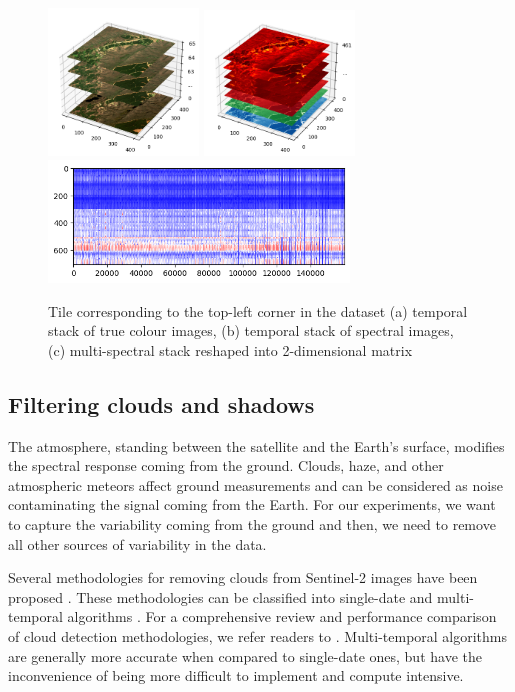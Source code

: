 \documentclass[essd, manuscript]{copernicus}
\begin{document}
\begin{figure}%
    {{\includegraphics[width=4cm]{fig2a.png} }}%
    {{\includegraphics[width=4cm]{fig2b.png} }}%
    {{\includegraphics[width=8cm]{fig2c.png} }}%
    \caption{Tile corresponding to the top-left corner in the dataset (a) temporal stack of true colour images, (b) temporal stack of spectral images, (c) multi-spectral stack reshaped into 2-dimensional matrix}%
    \label{dataset_detail}%
\end{figure}

\subsection{Filtering clouds and shadows}
The atmosphere, standing between the satellite and the Earth's surface, modifies the spectral response coming from the ground. Clouds, haze, and other atmospheric meteors affect ground measurements and can be considered as noise contaminating the signal coming from the Earth. For our experiments, we want to capture the variability coming from the ground and then, we need to remove all other sources of variability in the data.

Several methodologies for removing clouds from Sentinel-2 images have been proposed \citep{louis2016sentinel,hagolle2017maja,qiu2019fmask}. These methodologies can be classified into single-date and multi-temporal algorithms \citep{}. For a comprehensive review and performance comparison of cloud detection methodologies, we refer readers to \citep{zhu2018cloud}. Multi-temporal algorithms are generally more accurate when compared to single-date ones, but have the inconvenience of being more difficult to implement and compute intensive.
\end{document}
